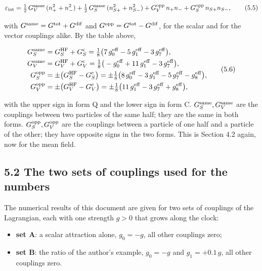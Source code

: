 \documentclass[
  10pt,
]{article}
\providecommand{\tightlist}{%
  \setlength{\itemsep}{0pt}\setlength{\parskip}{0pt}}
\begin{document}
\[\varepsilon_{\rm int}=\tfrac12\,G_V^{\rm same}\,(n_+^2+n_-^2)+\tfrac12\,G_S^{\rm same}\,(n_{S+}^2+n_{S-}^2)+G_V^{\rm opp}\,n_+n_-+G_S^{\rm opp}\,n_{S+}n_{S-},\tag{5.5}\]

with \(G^{\rm same}=G^{\rm tot}+G^{\rm dif}\) and
\(G^{\rm opp}=G^{\rm tot}-G^{\rm dif}\), for the scalar and for the
vector couplings alike. By the table above,

\[\begin{aligned}
G_S^{\rm same}&=G_S^{\rm HF}+G_S^{\rm c}=\tfrac18\big(7\,g_0^{\rm eff}-5\,g_1^{\rm eff}-3\,g_7^{\rm eff}\big),\\
G_V^{\rm same}&=G_V^{\rm HF}+G_V^{\rm c}=\tfrac18\big(-g_0^{\rm eff}+11\,g_1^{\rm eff}-3\,g_7^{\rm eff}\big),\\
G_S^{\rm opp}&=\pm\big(G_S^{\rm HF}-G_S^{\rm c}\big)=\pm\tfrac18\big(8\,g_0^{\rm eff}-3\,g_1^{\rm eff}-5\,g_7^{\rm eff}-g_8^{\rm eff}\big),\\
G_V^{\rm opp}&=\pm\big(G_V^{\rm HF}-G_V^{\rm c}\big)=\pm\tfrac18\big(11\,g_1^{\rm eff}-3\,g_7^{\rm eff}+g_8^{\rm eff}\big),
\end{aligned}\tag{5.6}\]

with the upper sign in form Q and the lower sign in form C.
\(G_S^{\rm same},G_V^{\rm same}\) are the couplings between two
particles of the same half; they are the same in both forms.
\(G_S^{\rm opp},G_V^{\rm opp}\) are the couplings between a particle of
one half and a particle of the other; they have opposite signs in the
two forms. This is Section 4.2 again, now for the mean field.

\hypertarget{the-two-sets-of-couplings-used-for-the-numbers}{%
\subsection{5.2 The two sets of couplings used for the
numbers}\label{the-two-sets-of-couplings-used-for-the-numbers}}

The numerical results of this document are given for two sets of
couplings of the Lagrangian, each with one strength \(g>0\) that grows
along the clock:

\begin{itemize}
\tightlist
\item
  \textbf{set A}: a scalar attraction alone, \(g_0=-g\), all other
  couplings zero;
\item
  \textbf{set B}: the ratio of the author's example, \(g_0=-g\) and
  \(g_1=+0.1\,g\), all other couplings zero.
\end{itemize}
\end{document}
